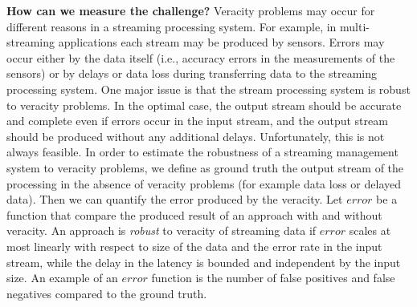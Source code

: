 %
%

\textbf{How can we measure the challenge?}
Veracity problems may occur for different reasons in a streaming processing system. For example, in multi-streaming applications each stream may be produced by sensors. Errors may occur either by the data itself (i.e., accuracy errors in the measurements of the sensors) or by delays or data loss during transferring data to the streaming processing system. One major issue is that the stream processing system is robust to veracity problems. In the optimal case, the output stream should be accurate and complete even if errors occur in the input stream, and the output stream should be produced without any additional delays. Unfortunately, this is not always feasible. In order to estimate the robustness of a streaming management system to veracity problems, we define as ground truth the output stream of the processing in the absence of veracity problems (for example data loss or delayed data). Then we can quantify the error produced by the veracity. Let $error$ be a function that compare the produced result of an approach with and without veracity. An approach is \emph{robust} to veracity of streaming data if $error$ scales at most linearly with respect to size of the data and the error rate in the input stream, while the delay in the latency is bounded and independent by the input size. An example of an $error$ function is the number of false positives and false negatives compared to the ground truth.

